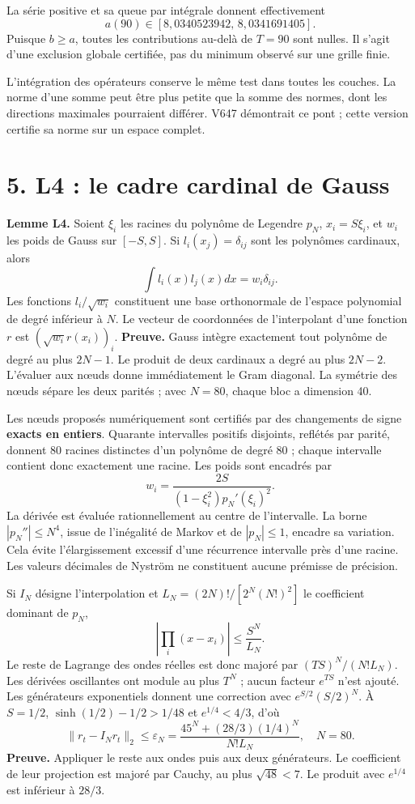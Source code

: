 \documentclass[
  10pt,
  a4paper,
]{article}
\begin{document}
La série positive et sa queue par intégrale donnent effectivement \[
a(90)\in[8{,}0340523942,\,8{,}0341691405].
\] Puisque \(b\ge a\), toutes les contributions au-delà de \(T=90\) sont
nulles. Il s'agit d'une exclusion globale certifiée, pas du minimum
observé sur une grille finie.

L'intégration des opérateurs conserve le même test dans toutes les
couches. La norme d'une somme peut être plus petite que la somme des
normes, dont les directions maximales pourraient différer. V647
démontrait ce pont ; cette version certifie sa norme sur un espace
complet.

\hypertarget{l4-le-cadre-cardinal-de-gauss}{%
\section{5. L4 : le cadre cardinal de
Gauss}\label{l4-le-cadre-cardinal-de-gauss}}

\textbf{Lemme L4.} Soient \(\xi_i\) les racines du polynôme de Legendre
\(p_N\), \(x_i=S\xi_i\), et \(w_i\) les poids de Gauss sur \([-S,S]\).
Si \(l_i(x_j)=\delta_{ij}\) sont les polynômes cardinaux, alors \[
\int l_i(x)l_j(x)dx=w_i\delta_{ij}.
\] Les fonctions \(l_i/\sqrt{w_i}\) constituent une base orthonormale de
l'espace polynomial de degré inférieur à \(N\). Le vecteur de
coordonnées de l'interpolant d'une fonction \(r\) est
\((\sqrt{w_i}r(x_i))_i\). \textbf{Preuve.} Gauss intègre exactement tout
polynôme de degré au plus \(2N-1\). Le produit de deux cardinaux a degré
au plus \(2N-2\). L'évaluer aux nœuds donne immédiatement le Gram
diagonal. La symétrie des nœuds sépare les deux parités ; avec \(N=80\),
chaque bloc a dimension 40.

Les nœuds proposés numériquement sont certifiés par des changements de
signe \textbf{exacts en entiers}. Quarante intervalles positifs
disjoints, reflétés par parité, donnent 80 racines distinctes d'un
polynôme de degré 80 ; chaque intervalle contient donc exactement une
racine. Les poids sont encadrés par \[
w_i=\frac{2S}{(1-\xi_i^2)p_N'(\xi_i)^2}.
\] La dérivée est évaluée rationnellement au centre de l'intervalle. La
borne \(|p_N''|\le N^4\), issue de l'inégalité de Markov et de
\(|p_N|\le1\), encadre sa variation. Cela évite l'élargissement excessif
d'une récurrence intervalle près d'une racine. Les valeurs décimales de
Nyström ne constituent aucune prémisse de précision.

Si \(I_N\) désigne l'interpolation et \(L_N=(2N)!/[2^N(N!)^2]\) le
coefficient dominant de \(p_N\), \[
\left|\prod_i(x-x_i)\right|\le\frac{S^N}{L_N}.
\] Le reste de Lagrange des ondes réelles est donc majoré par
\((TS)^N/(N!L_N)\). Les dérivées oscillantes ont module au plus \(T^N\)
; aucun facteur \(e^{TS}\) n'est ajouté. Les générateurs exponentiels
donnent une correction avec \(e^{S/2}(S/2)^N\). À \(S=1/2\),
\(\sinh(1/2)-1/2>1/48\) et \(e^{1/4}<4/3\), d'où \[
\|r_t-I_Nr_t\|_2\le\varepsilon_N
=\frac{45^N+(28/3)(1/4)^N}{N!L_N},\quad N=80.
\] \textbf{Preuve.} Appliquer le reste aux ondes puis aux deux
générateurs. Le coefficient de leur projection est majoré par Cauchy, au
plus \(\sqrt{48}<7\). Le produit avec \(e^{1/4}\) est inférieur à
\(28/3\).
\end{document}
